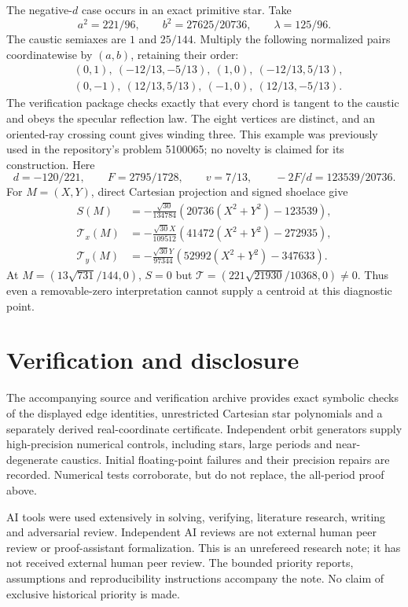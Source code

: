 \documentclass[11pt]{article}
\begin{document}
The negative-$d$ case occurs in an exact primitive star. Take
\[
 a^2=221/96,\qquad b^2=27625/20736,\qquad\lambda=125/96.
\]
The caustic semiaxes are $1$ and $25/144$. Multiply the following normalized
pairs coordinatewise by $(a,b)$, retaining their order:
\begin{align*}
 &(0,1),\ (-12/13,-5/13),\ (1,0),\ (-12/13,5/13),\\
 &(0,-1),\ (12/13,5/13),\ (-1,0),\ (12/13,-5/13).
\end{align*}
The verification package checks exactly that every chord is tangent to the
caustic and obeys the specular reflection law. The eight vertices are
distinct, and an oriented-ray crossing count gives winding three.
This example was previously used in the repository's problem 5100065; no
novelty is claimed for its construction. Here
\[
 d=-120/221,\qquad F=2795/1728,\qquad v=7/13,\qquad
 -2F/d=123539/20736.
\]
For $M=(X,Y)$, direct Cartesian projection and signed shoelace give
\begin{align*}
 S(M)&=-\frac{\sqrt{30}}{134784}
          (20736(X^2+Y^2)-123539),\\
 \mathcal T_x(M)&=-\frac{\sqrt{30}X}{109512}
          (41472(X^2+Y^2)-272935),\\
 \mathcal T_y(M)&=-\frac{\sqrt{30}Y}{97344}
          (52992(X^2+Y^2)-347633).
\end{align*}
At $M=(13\sqrt{731}/144,0)$, $S=0$ but
$\mathcal T=(221\sqrt{21930}/10368,0)\ne0$.
Thus even a removable-zero interpretation cannot supply a centroid at
this diagnostic point.

\section*{Verification and disclosure}
The accompanying source and verification archive provides exact symbolic
checks of the displayed edge identities, unrestricted Cartesian star
polynomials and a separately derived real-coordinate certificate. Independent
orbit generators supply high-precision numerical controls, including stars,
large periods and near-degenerate caustics. Initial floating-point failures
and their precision repairs are recorded. Numerical tests corroborate, but
do not replace, the all-period proof above.

AI tools were used extensively in solving, verifying, literature research,
writing and adversarial review. Independent AI reviews are not external
human peer review or proof-assistant formalization. This is an unrefereed
research note; it has not received external human peer review. The bounded
priority reports, assumptions and reproducibility instructions accompany
the note. No claim of exclusive historical priority is made.
\end{document}
